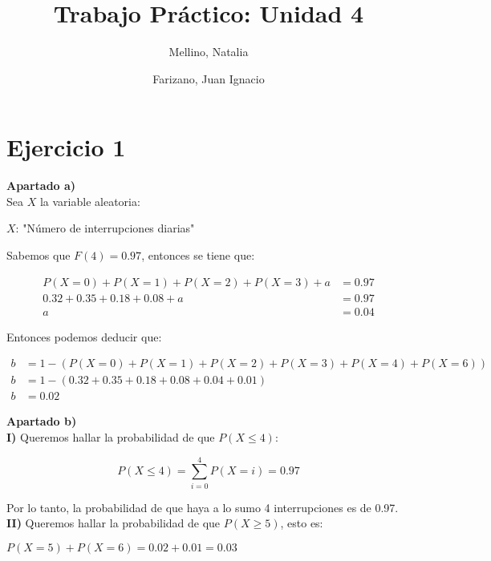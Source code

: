 \documentclass[11pt]{article}
\title{Trabajo Práctico: Unidad 4}
\author{Mellino, Natalia \and Farizano, Juan Ignacio}
\date{}
\begin{document}
\maketitle

\section*{Ejercicio 1}

\textbf{Apartado a)} \\

Sea $ X $ la variable aleatoria:

\begin{center}
  $ X $: "Número de interrupciones diarias"
\end{center}

Sabemos que $ F(4) = 0.97 $, entonces se tiene que:


\begin{align*}
  P(X = 0) + P(X = 1) + P(X = 2) + P(X = 3) + a & =  0.97 \\
  0.32 + 0.35 + 0.18 + 0.08 + a                 & =  0.97 \\
  a                                             & =  0.04
\end{align*}

Entonces podemos deducir que:

\begin{align*}
  b & =  1 - (P(X = 0) + P(X = 1) + P(X = 2) + P(X = 3) + P(X = 4) + P(X = 6)) \\
  b & =  1 - (0.32 + 0.35 + 0.18 + 0.08 + 0.04 + 0.01)                         \\
  b & =  0.02
\end{align*}

\textbf{Apartado b)} \\

\textbf{I)} Queremos hallar la probabilidad de que $ P(X \leq 4) $:

\[ P(X \leq 4) = \sum_{i=0}^{4}P(X = i) = 0.97 \]

Por lo tanto, la probabilidad de que haya a lo sumo 4 interrupciones es de 0.97.\\

\textbf{II)} Queremos hallar la probabilidad de que $ P(X \geq 5) $, esto es:

\begin{center}
  $ P(X = 5) + P(X = 6) = 0.02 + 0.01 = 0.03$
\end{center}
\end{document}
